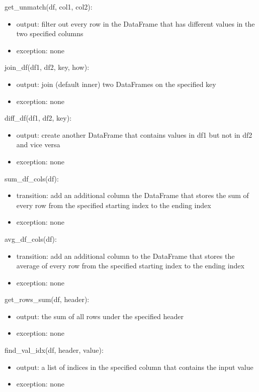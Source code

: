 \documentclass[12pt]{article}
\begin{document}
\noindent get\_unmatch(df, col1, col2):
\begin{itemize}
    \item output: filter out every row in the DataFrame that has different values in the two specified columns
    \item exception: none
\end{itemize}

\noindent join\_df(df1, df2, key, how):
\begin{itemize}
    \item output: join (default inner) two DataFrames on the specified key 
    \item exception: none
\end{itemize}

\noindent diff\_df(df1, df2, key):
\begin{itemize}
    \item output: create another DataFrame that contains values in df1 but not in df2 and vice versa
    \item exception: none
\end{itemize}

\noindent sum\_df\_cols(df):
\begin{itemize}
    \item transition: add an additional column the DataFrame that stores the sum of 
    every row from the specified starting index to the ending index
    \item exception: none
\end{itemize}

\noindent avg\_df\_cols(df):
\begin{itemize}
    \item transition: add an additional column to the DataFrame that stores the average of 
    every row from the specified starting index to the ending index
    \item exception: none
\end{itemize}

\noindent get\_rows\_sum(df, header):
\begin{itemize}
    \item output: the sum of all rows under the specified header
    \item exception: none
\end{itemize}

\noindent find\_val\_idx(df, header, value):
\begin{itemize}
    \item output: a list of indices in the specified column that contains the input value
    \item exception: none
\end{itemize}
\end{document}
